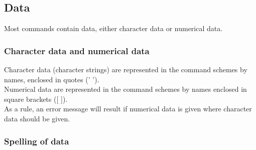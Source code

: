 \documentclass[12pt]{book}
\begin{document}
\subsection{Data}

Most commands contain data, either character data or numerical data.

\subsubsection{Character data and numerical data}

Character data (character strings) are represented in the command schemes by names, enclosed in quotes ('    ').
\\[2ex]
\noindent
Numerical data are represented in the command schemes by names enclosed in square brackets ([    ]).
\\[2ex]
\noindent
As a rule, an error message will result if numerical data is given where character data should be given.

\subsubsection{Spelling of data}
\end{document}
